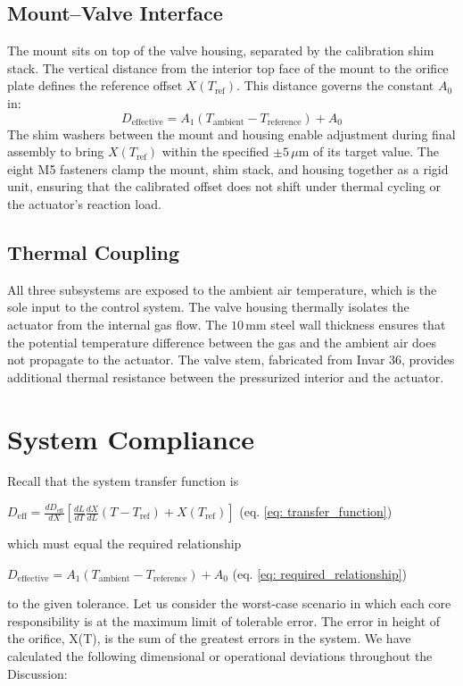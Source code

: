 \documentclass[12pt, letterpaper]{report}%
\newcounter{mycounter}           %
\newcounter{sub}[mycounter]      %
\newcommand{\requiredRelationship}{D_{\text{effective}} = A_1 (T_{\text{ambient}} - T_{\text{reference}}) + A_0}
\newcommand{\transferFunction}{D_{\text{eff}}=\frac{dD_{\text{eff}}}{dX} \left[\frac{dL}{dT}\frac{dX}{dL}(T-T_{\text{ref}})+X\left(T_{\text{ref}} \right) \right]}
\begin{document}
    \subsection{Mount–Valve Interface} 
    The mount sits on top of the valve housing, separated by the calibration shim stack. The vertical distance from the interior top face of the mount to the orifice plate defines the reference offset $X(T_{\text{ref}})$. This distance governs the constant $A_0$ in: $$\requiredRelationship$$ The shim washers between the mount and housing enable 
    adjustment during final assembly to bring $X(T_{\text{ref}})$ within the specified $\pm 5\,\mu\text{m}$ of its target value. The eight M5 fasteners clamp the mount, shim stack, and housing together as a rigid unit, ensuring 
    that the calibrated offset does not shift under thermal cycling or the actuator's reaction load.

    \subsection{Thermal Coupling}
    \label{subsec:sub_int}

    All three subsystems are exposed to the ambient air temperature, which is the sole input to the control system. The valve housing thermally isolates the actuator from the internal gas flow. The $10\,\text{mm}$ steel 
    wall thickness ensures that the potential temperature difference between the gas and the ambient air does not propagate to the actuator. The valve stem, fabricated from Invar 36, provides 
    additional thermal resistance between the pressurized interior and the actuator. 



    \section{System Compliance}
    \label{subsec:sys_comp}

        Recall that the system transfer function is 
        
        $\transferFunction$ \quad (eq. \ref{eq: transfer_function})
        
        which must equal the required relationship

        $\requiredRelationship$ \quad (eq. \ref{eq: required_relationship})

        to the given tolerance. Let us consider the worst-case scenario in which each core responsibility is at the maximum limit of tolerable error.
        The error in height of the orifice, X(T), is the sum of the greatest errors in the system. We have calculated the following dimensional or operational deviations throughout the Discussion:
        
\end{document}
